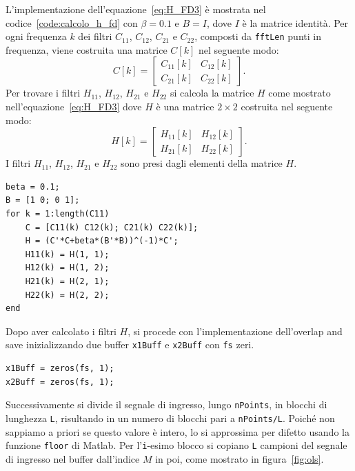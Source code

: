 \documentclass[12pt,a4paper,titlepage]{article}
\begin{document}
L'implementazione dell'equazione~\eqref{eq:H_FD3} è mostrata nel codice~\ref{code:calcolo_h_fd} con $\beta = 0.1$ e $B = I$, dove $I$ è la matrice identità. Per ogni frequenza $k$ dei filtri $C_{11}$, $C_{12}$, $C_{21}$ e $C_{22}$, composti da \texttt{fftLen} punti in frequenza, viene costruita una matrice $C [k]$ nel seguente modo:
\begin{equation*}
C [k] =
\begin{bmatrix}
C_{11}[k]	& C_{12}[k]\\
C_{21}[k]	& C_{22}[k]
\end{bmatrix}.
\end{equation*}
Per trovare i filtri $H_{11}$, $H_{12}$, $H_{21}$ e $H_{22}$ si calcola la matrice $H$ come mostrato nell'equazione~\eqref{eq:H_FD3} dove $H$ è una matrice $2 \times 2$ costruita nel seguente modo:
\begin{equation*}
H [k] =
\begin{bmatrix}
H_{11}[k]	& H_{12}[k]\\
H_{21}[k]	& H_{22}[k]
\end{bmatrix}.
\end{equation*}
I filtri $H_{11}$, $H_{12}$, $H_{21}$ e $H_{22}$ sono presi dagli elementi della matrice $H$.

\begin{lstlisting}[label=code:calcolo_h_fd, caption=Calcolo dei filtri di cancellazione del crosstalk, captionpos=b]
beta = 0.1;
B = [1 0; 0 1];
for k = 1:length(C11)
    C = [C11(k) C12(k); C21(k) C22(k)];
    H = (C'*C+beta*(B'*B))^(-1)*C'; 
    H11(k) = H(1, 1);
    H12(k) = H(1, 2);
    H21(k) = H(2, 1);
    H22(k) = H(2, 2);
end
\end{lstlisting}

Dopo aver calcolato i filtri $H$, si procede con l'implementazione dell'overlap and save inizializzando due buffer \texttt{x1Buff} e \texttt{x2Buff} con \texttt{fs} zeri.

\begin{lstlisting}[label=code:buffer_ols, caption=Inizializzazione dei buffer per l'overlap and save, captionpos=b]
x1Buff = zeros(fs, 1);
x2Buff = zeros(fs, 1);
\end{lstlisting}

Successivamente si divide il segnale di ingresso, lungo \texttt{nPoints}, in blocchi di lunghezza \texttt{L}, risultando in un numero di blocchi pari a \texttt{nPoints/L}. Poiché non sappiamo a priori se questo valore è intero, lo si approssima per difetto usando la funzione \texttt{floor} di Matlab. Per l'\texttt{i}-esimo blocco si copiano \texttt{L} campioni del segnale di ingresso nel buffer dall'indice $M$ in poi, come mostrato in figura~\ref{fig:ols}.
\end{document}
